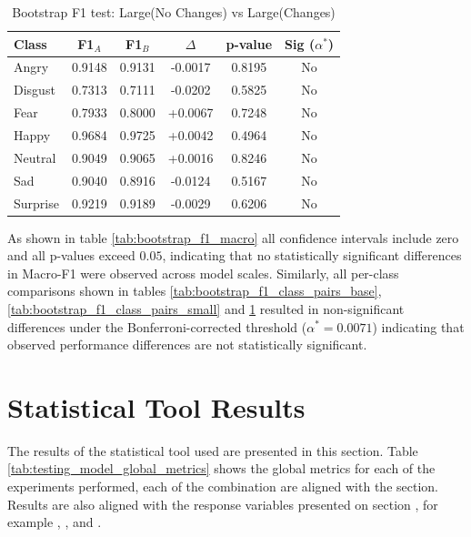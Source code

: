 \begin{table}[H]
\centering
\caption{Bootstrap F1 test: Large(No Changes) vs Large(Changes)}
\label{tab:bootstrap_f1_class_pairs_large}
\begin{tabular}{lccccc}
\hline
Class & F1$_A$ & F1$_B$ & $\Delta$ & p-value & Sig ($\alpha^*$) \\
\hline
Angry    & 0.9148 & 0.9131 & -0.0017 & 0.8195 & No \\
Disgust  & 0.7313 & 0.7111 & -0.0202 & 0.5825 & No \\
Fear     & 0.7933 & 0.8000 & +0.0067 & 0.7248 & No \\
Happy    & 0.9684 & 0.9725 & +0.0042 & 0.4964 & No \\
Neutral  & 0.9049 & 0.9065 & +0.0016 & 0.8246 & No \\
Sad      & 0.9040 & 0.8916 & -0.0124 & 0.5167 & No \\
Surprise & 0.9219 & 0.9189 & -0.0029 & 0.6206 & No \\
\end{tabular}
\end{table}
\noindent
As shown in table \ref{tab:bootstrap_f1_macro}
all confidence intervals include zero and all p-values exceed $0.05$, indicating that no statistically significant differences in Macro-F1 were observed across model scales. Similarly, all per-class comparisons shown in tables \ref{tab:bootstrap_f1_class_pairs_base}, \ref{tab:bootstrap_f1_class_pairs_small} and \ref{tab:bootstrap_f1_class_pairs_large} resulted in non-significant differences under the Bonferroni-corrected threshold ($\alpha^* = 0.0071$) indicating that observed performance differences are not statistically significant.

\section{Statistical Tool Results}

The results of the statistical tool used are presented in this section. Table \ref{tab:testing_model_global_metrics} shows the global metrics for each of the experiments performed, each of the combination are aligned with the   section. Results are also aligned with the response variables presented on section , for example  , ,  and .



